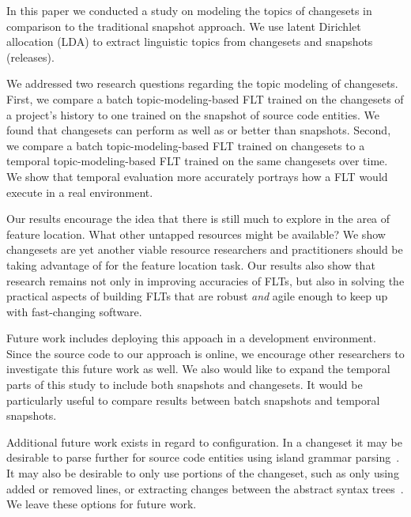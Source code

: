 
In this paper we conducted a study on modeling the topics of changesets in
comparison to the traditional snapshot approach.  We use latent Dirichlet
allocation (LDA) to extract linguistic topics from changesets and snapshots
(releases).

We addressed two research questions regarding the topic modeling of changesets.
First, we compare a batch topic-modeling-based FLT trained on the changesets of
a project's history to one trained on the snapshot of source code entities.  We
found that changesets can perform as well as or better than snapshots.  Second,
we compare a batch topic-modeling-based FLT trained on changesets to a temporal
topic-modeling-based FLT trained on the same changesets over time.  We show that
temporal evaluation more accurately portrays how a FLT would execute in a real
environment.

Our results encourage the idea that there is still much to explore in the area
of feature location. What other untapped resources might be available? We show
changesets are yet another viable resource researchers and practitioners should
be taking advantage of for the feature location task.  Our results also show
that research remains not only in improving accuracies of FLTs, but also in
solving the practical aspects of building FLTs that are robust \emph{and} agile
enough to keep up with fast-changing software.

Future work includes deploying this appoach in a development environment.  Since
the source code to our approach is online, we encourage other researchers to
investigate this future work as well.  We also would like to expand the temporal
parts of this study to include both snapshots and changesets.  It would be
particularly useful to compare results between batch snapshots and temporal
snapshots. 

Additional future work exists in regard to configuration. In a changeset it may
be desirable to parse further for source code entities using island grammar
parsing~\cite{Moonen:2001}.  It may also be desirable to only use portions of
the changeset, such as only using added or removed lines, or extracting changes
between the abstract syntax trees~\cite{Fluri-etal:2007}.  We leave these
options for future work.


